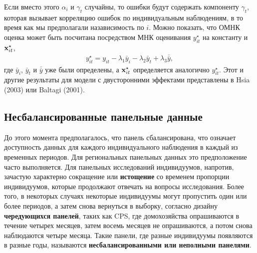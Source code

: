 Если вместо этого $\alpha_i$ и $\gamma_t$  случайны, то ошибки будут содержать компоненту $\gamma_t$, которая вызывает корреляцию ошибок по индивидуальным наблюдениям, в то время как мы предполагали назависимость по $i$. Можно показать, что ОМНК оценка может быть посчитана посредством МНК оценивания $y^{\star}_{it}$ на константу и $\mathbf{x}_{it}^{\star}$,
 \begin{align}
 y_{it}^{\star}=y_{it}-\lambda_1\bar{y}_i-\lambda_2\bar{y}_t+\lambda_3\overline{\bar{y}},
\nonumber
\end{align}
где $\bar{y}_i$, $\bar{y}_t$ и $\overline{\bar{y}}$ уже были определены, а $\mathbf{x}^{\star}_{it}$ определяется аналогично $y^{\star}_{it}$. Этот и другие результаты для модели с двусторонними эффектами представлены в Hsia (2003) или Baltagi (2001). 

\subsection{Несбалансированные панельные данные}

До этого момента предполагалось, что панель сбалансирована, что означает доступность данных для каждого индивидуального наблюдения в каждый из временных периодов. Для региональных панельных данных это предположение часто выполняется. Для панельных исследований индивидуумов, напротив, зачастую характерно сокращение или \textbf{истощение} со временем пропорции индивидуумов, которые продолжают отвечать на вопросы исследования. Более того,  в некоторых случаях некоторые индивидуумы могут пропустить один или более периодов, а затем снова вернуться в выборку, согласно  дизайну \textbf{чередующихся панелей}, таких как CPS, где домохозяйства опрашиваются в течение четырех месяцев, затем восемь месяцев не опрашиваются, а потом снова наблюдаются четыре месяца. Такие панели, где разные индивидуумы появляются в разные годы, называются \textbf{несбалансированными или неполными панелями}.


